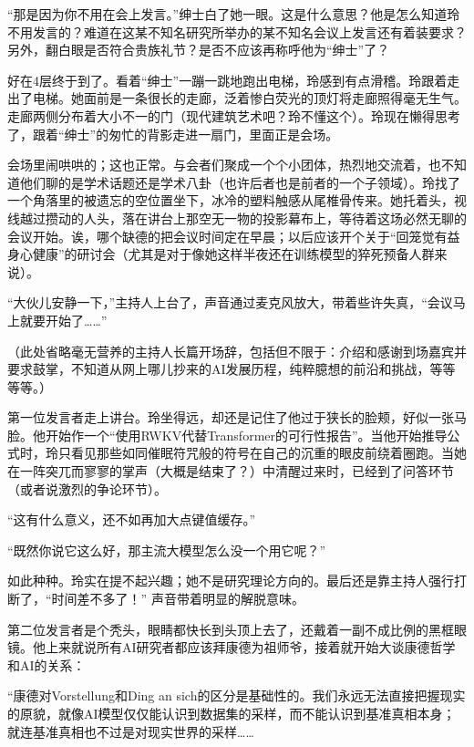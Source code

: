 “那是因为你不用在会上发言。”绅士白了她一眼。这是什么意思？他是怎么知道玲不用发言的？难道在这某不知名研究所举办的某不知名会议上发言还有着装要求？另外，翻白眼是否符合贵族礼节？是否不应该再称呼他为“绅士”了？

好在4层终于到了。看着“绅士”一蹦一跳地跑出电梯，玲感到有点滑稽。玲跟着走出了电梯。她面前是一条很长的走廊，泛着惨白荧光的顶灯将走廊照得毫无生气。走廊两侧分布着大小不一的门（现代建筑艺术吧？玲不懂这个）。玲现在懒得思考了，跟着“绅士”的匆忙的背影走进一扇门，里面正是会场。

会场里闹哄哄的；这也正常。与会者们聚成一个个小团体，热烈地交流着，也不知道他们聊的是学术话题还是学术八卦（也许后者也是前者的一个子领域）。玲找了一个角落里的被遗忘的空位置坐下，冰冷的塑料触感从尾椎骨传来。她托着头，视线越过攒动的人头，落在讲台上那空无一物的投影幕布上，等待着这场必然无聊的会议开始。诶，哪个缺德的把会议时间定在早晨；以后应该开个关于“回笼觉有益身心健康”的研讨会（尤其是对于像她这样半夜还在训练模型的猝死预备人群来说）。

“大伙儿安静一下，”主持人上台了，声音通过麦克风放大，带着些许失真，“会议马上就要开始了……”

（此处省略毫无营养的主持人长篇开场辞，包括但不限于：介绍和感谢到场嘉宾并要求鼓掌，不知道从网上哪儿抄来的AI发展历程，纯粹臆想的前沿和挑战，等等等等。）

第一位发言者走上讲台。玲坐得远，却还是记住了他过于狭长的脸颊，好似一张马脸。他开始作一个“使用RWKV代替Transformer的可行性报告”。当他开始推导公式时，玲只看见那些如同催眠符咒般的符号在自己的沉重的眼皮前绕着圈跑。当她在一阵突兀而寥寥的掌声（大概是结束了？）中清醒过来时，已经到了问答环节（或者说激烈的争论环节）。

“这有什么意义，还不如再加大点键值缓存。”

“既然你说它这么好，那主流大模型怎么没一个用它呢？”

如此种种。玲实在提不起兴趣；她不是研究理论方向的。最后还是靠主持人强行打断了，“时间差不多了！” 声音带着明显的解脱意味。

第二位发言者是个秃头，眼睛都快长到头顶上去了，还戴着一副不成比例的黑框眼镜。他上来就说所有AI研究者都应该拜康德为祖师爷，接着就开始大谈康德哲学和AI的关系：

“康德对Vorstellung和Ding an sich的区分是基础性的。我们永远无法直接把握现实的原貌，就像AI模型仅仅能认识到数据集的采样，而不能认识到基准真相本身；就连基准真相也不过是对现实世界的采样……

